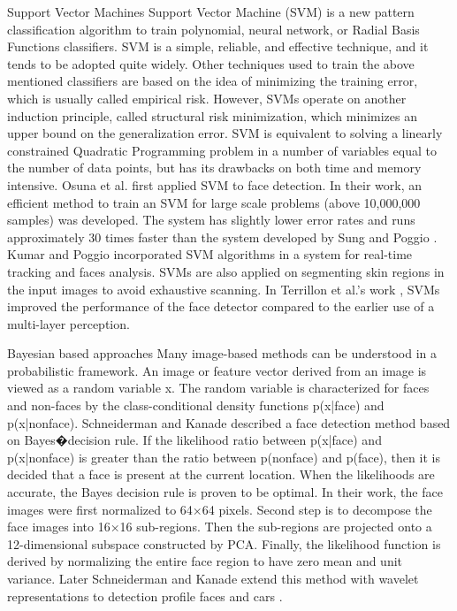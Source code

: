 Support Vector Machines
Support Vector Machine (SVM) \cite{} is a new pattern classification algorithm to train polynomial, neural network, or Radial Basis Functions classifiers. SVM is a simple, reliable, and effective technique, and it tends to be adopted quite widely. Other techniques used to train the above mentioned classifiers are based on the idea of minimizing the training error, which is usually called empirical risk. However, SVMs operate on another induction principle, called structural risk minimization, which minimizes an upper bound on the generalization error. SVM is equivalent to solving a linearly constrained Quadratic Programming problem in a number of variables equal to the number of data points, but has its drawbacks on both time and memory intensive. Osuna et al. \cite{} first applied SVM to face detection. In their work, an efficient method to train an SVM for large scale problems (above 10,000,000 samples) was developed. The system has slightly lower error rates and runs approximately 30 times faster than the system developed by Sung and Poggio \cite{}. Kumar and Poggio \cite{} incorporated SVM algorithms in a system for real-time tracking and faces analysis. SVMs are also applied on segmenting skin regions in the input images to avoid exhaustive scanning. In Terrillon et al.’s work \cite{}, SVMs improved the performance of the face detector compared to the earlier use of a multi-layer perception. 

Bayesian based approaches
Many image-based methods can be understood in a probabilistic framework. An image or feature vector derived from an image is viewed as a random variable x. The random variable is characterized for faces and non-faces by the class-conditional density functions p(x|face) and p(x|nonface). Schneiderman and Kanade \cite{} described a face detection method based on Bayes�decision rule. If the likelihood ratio between p(x|face) and p(x|nonface) is greater than the ratio between p(nonface) and p(face), then it is decided that a face is present at the current location. When the likelihoods are accurate, the Bayes decision rule is proven to be optimal. In their work, the face images were first normalized to 64×64 pixels. Second step is to decompose the face images into 16×16 sub-regions. Then the sub-regions are projected onto a 12-dimensional subspace constructed by PCA. Finally, the likelihood function is derived by normalizing the entire face region to have zero mean and unit variance. Later Schneiderman and Kanade extend this method with wavelet representations to detection profile faces and cars \cite{}.


